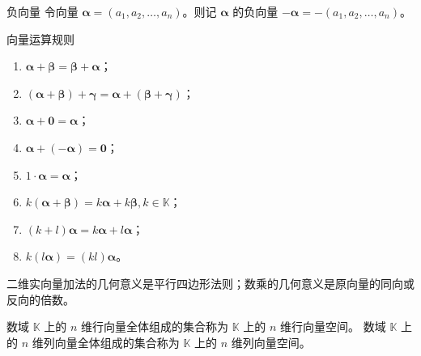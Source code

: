 \begin{definition}{负向量}
  令向量 $\bm{\alpha} = (a_1,a_2, \ldots ,a_n)$。则记 $\bm{\alpha}$ 的负向量 $-\bm{\alpha} = -(a_1,a_2, \ldots ,a_n)$。
\end{definition}

\begin{proposition}{向量运算规则}
  \begin{enumerate}
    \item $\bm{\alpha} + \bm{\beta} = \bm{\beta} + \bm{\alpha}$；
    \item $(\bm{\alpha} + \bm{\beta}) + \bm{\gamma} = \bm{\alpha} + (\bm{\beta} + \bm{\gamma})$；
    \item $\bm{\alpha} + \bm{0} = \bm{\alpha}$；
    \item $\bm{\alpha} + (-\bm{\alpha}) = \bm{0}$；
    \item $1 \cdot\bm{\alpha}= \bm{\alpha}$；
    \item $k(\bm{\alpha} + \bm{\beta}) = k\bm{\alpha} + k\bm{\beta}, k \in \mathbb{K}$；
    \item $(k + l)\bm{\alpha} = k\bm{\alpha} + l\bm{\alpha}$；
    \item $k(l\bm{\alpha}) = (kl)\bm{\alpha}$。
  \end{enumerate}
\end{proposition}
\begin{remark}
  二维实向量加法的几何意义是平行四边形法则；数乘的几何意义是原向量的同向或反向的倍数。
\end{remark}

\begin{definition}
  数域 $\mathbb{K}$ 上的 $n$ 维行向量全体组成的集合称为 $\mathbb{K}$ 上的 $n$ 维行向量空间。
  数域 $\mathbb{K}$ 上的 $n$ 维列向量全体组成的集合称为 $\mathbb{K}$ 上的 $n$ 维列向量空间。
\end{definition}

